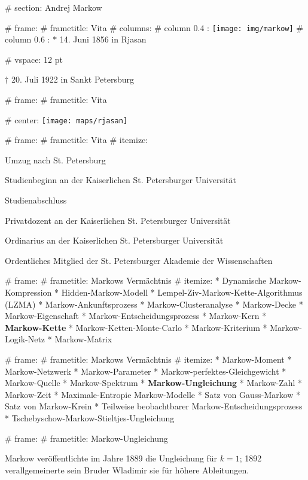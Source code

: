 # section: Andrej Markow

# frame:
  # frametitle: Vita
  # columns:
    # column {0.4 \textwidth}:
      \texttt{[image: img/markow]}
    # column {0.6 \textwidth}:
      $*$ 14. Juni 1856 in Rjasan

      # vspace: 12 pt

      $\dagger$ 20. Juli 1922 in Sankt Petersburg

# frame:
  # frametitle: Vita

  # center:
    \texttt{[image: maps/rjasan]}

# frame:
  # frametitle: Vita
    # itemize:
      \item[1866 (10)] Umzug nach St. Petersburg
      \item[1874 (18)] Studienbeginn an der Kaiserlichen St. Petersburger Universität
      \item[1878 (22)] Studienabschluss
      \item[1880 (24)] Privatdozent an der Kaiserlichen St. Petersburger Universität
      \item[1886 (30)] Ordinarius an der Kaiserlichen St. Petersburger Universität
      \item[1896 (40)] Ordentliches Mitglied der St. Petersburger Akademie der Wissenschaften

# frame:
  # frametitle: Markows Vermächtnis
  # itemize:
    * Dynamische Markow-Kompression
    * Hidden-Markow-Modell
    * Lempel-Ziv-Markow-Kette-Algorithmus (LZMA)
    * Markow-Ankunftsprozess
    * Markow-Clusteranalyse
    * Markow-Decke
    * Markow-Eigenschaft
    * Markow-Entscheidungsprozess
    * Markow-Kern
    * \textbf{Markow-Kette}
    * Markow-Ketten-Monte-Carlo
    * Markow-Kriterium
    * Markow-Logik-Netz
    * Markow-Matrix

# frame:
  # frametitle: Markows Vermächtnis
  # itemize:
    * Markow-Moment
    * Markow-Netzwerk
    * Markow-Parameter
    * Markow-perfektes-Gleichgewicht
    * Markow-Quelle
    * Markow-Spektrum
    * \textbf{Markow-Ungleichung}
    * Markow-Zahl
    * Markow-Zeit
    * Maximale-Entropie Markow-Modelle
    * Satz von Gauss-Markow
    * Satz von Markow-Krein
    * Teilweise beobachtbarer Markow-Entscheidungsprozess
    * Tschebyschow-Markow-Stieltjes-Ungleichung

# frame:
  # frametitle: Markow-Ungleichung

  Markow veröffentlichte im Jahre 1889 die Ungleichung für $k = 1$;
  1892 verallgemeinerte sein Bruder Wladimir sie für höhere Ableitungen.


